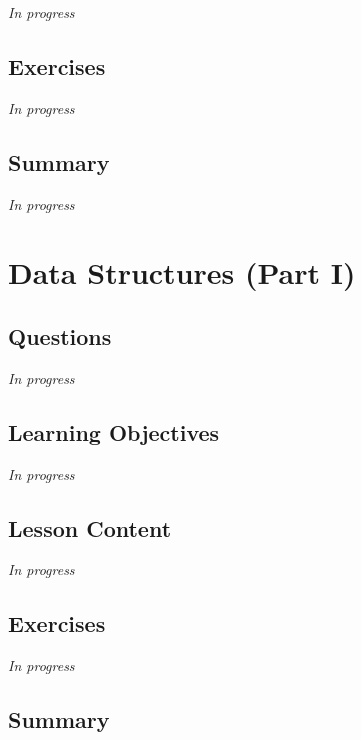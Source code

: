 \documentclass[
  letterpaper,
  DIV=11,
  numbers=noendperiod]{scrreprt}
\begin{document}
\emph{In progress}

\hypertarget{exercises-8}{%
\section{Exercises}\label{exercises-8}}

\emph{In progress}

\hypertarget{summary-9}{%
\section{Summary}\label{summary-9}}

\emph{In progress}


\hypertarget{sec-data-structure-1}{%
\chapter{Data Structures (Part I)}\label{sec-data-structure-1}}

\hypertarget{questions-9}{%
\section{Questions}\label{questions-9}}

\emph{In progress}

\hypertarget{learning-objectives-9}{%
\section{Learning Objectives}\label{learning-objectives-9}}

\emph{In progress}

\hypertarget{lesson-content-9}{%
\section{Lesson Content}\label{lesson-content-9}}

\emph{In progress}

\hypertarget{exercises-9}{%
\section{Exercises}\label{exercises-9}}

\emph{In progress}

\hypertarget{summary-10}{%
\section{Summary}\label{summary-10}}
\end{document}

